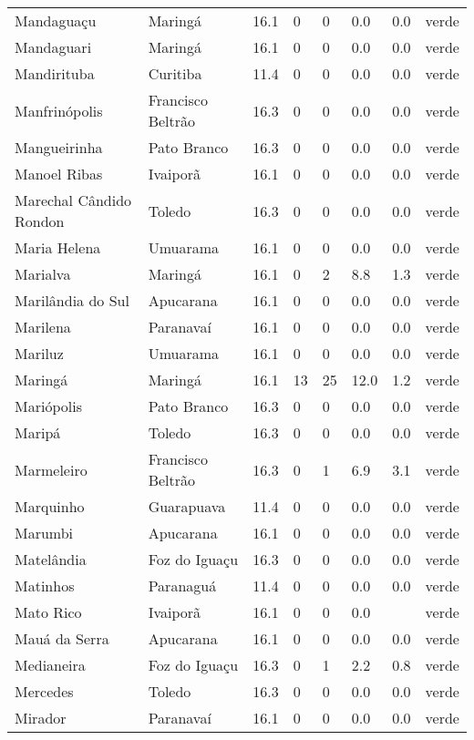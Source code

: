 \begin{longtable}{l|lllllll}
  Mandaguaçu & Maringá & 16.1 & 0 & 0 & 0.0 & 0.0 & verde \\ 
  Mandaguari & Maringá & 16.1 & 0 & 0 & 0.0 & 0.0 & verde \\ 
  Mandirituba & Curitiba & 11.4 & 0 & 0 & 0.0 & 0.0 & verde \\ 
  Manfrinópolis & Francisco Beltrão & 16.3 & 0 & 0 & 0.0 & 0.0 & verde \\ 
  Mangueirinha & Pato Branco & 16.3 & 0 & 0 & 0.0 & 0.0 & verde \\ 
  Manoel Ribas & Ivaiporã & 16.1 & 0 & 0 & 0.0 & 0.0 & verde \\ 
  Marechal Cândido Rondon & Toledo & 16.3 & 0 & 0 & 0.0 & 0.0 & verde \\ 
  Maria Helena & Umuarama & 16.1 & 0 & 0 & 0.0 & 0.0 & verde \\ 
  Marialva & Maringá & 16.1 & 0 & 2 & 8.8 & 1.3 & verde \\ 
  Marilândia do Sul & Apucarana & 16.1 & 0 & 0 & 0.0 & 0.0 & verde \\ 
  Marilena & Paranavaí & 16.1 & 0 & 0 & 0.0 & 0.0 & verde \\ 
  Mariluz & Umuarama & 16.1 & 0 & 0 & 0.0 & 0.0 & verde \\ 
  Maringá & Maringá & 16.1 & 13 & 25 & 12.0 & 1.2 & verde \\ 
  Mariópolis & Pato Branco & 16.3 & 0 & 0 & 0.0 & 0.0 & verde \\ 
  Maripá & Toledo & 16.3 & 0 & 0 & 0.0 & 0.0 & verde \\ 
  Marmeleiro & Francisco Beltrão & 16.3 & 0 & 1 & 6.9 & 3.1 & verde \\ 
  Marquinho & Guarapuava & 11.4 & 0 & 0 & 0.0 & 0.0 & verde \\ 
  Marumbi & Apucarana & 16.1 & 0 & 0 & 0.0 & 0.0 & verde \\ 
  Matelândia & Foz do Iguaçu & 16.3 & 0 & 0 & 0.0 & 0.0 & verde \\ 
  Matinhos & Paranaguá & 11.4 & 0 & 0 & 0.0 & 0.0 & verde \\ 
  Mato Rico & Ivaiporã & 16.1 & 0 & 0 & 0.0 &  & verde \\ 
  Mauá da Serra & Apucarana & 16.1 & 0 & 0 & 0.0 & 0.0 & verde \\ 
  Medianeira & Foz do Iguaçu & 16.3 & 0 & 1 & 2.2 & 0.8 & verde \\ 
  Mercedes & Toledo & 16.3 & 0 & 0 & 0.0 & 0.0 & verde \\ 
  Mirador & Paranavaí & 16.1 & 0 & 0 & 0.0 & 0.0 & verde \\ 

\end{longtable}
